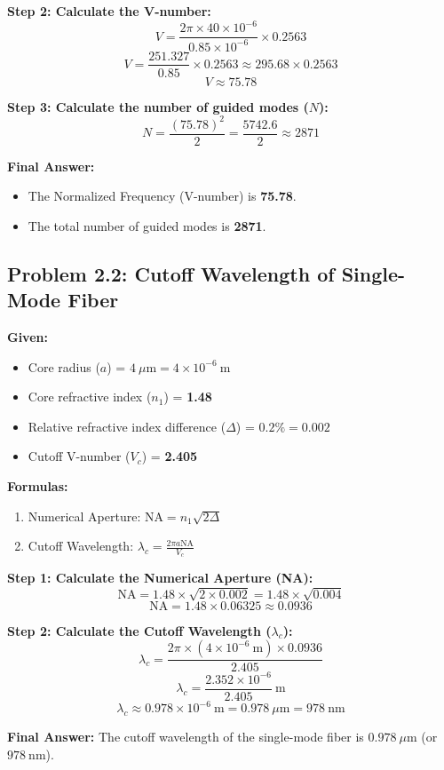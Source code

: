 \textbf{Step 2: Calculate the V-number:}
\[ V = \frac{2\pi \times 40 \times 10^{-6}}{0.85 \times 10^{-6}} \times 0.2563 \]
\[ V = \frac{251.327}{0.85} \times 0.2563 \approx 295.68 \times 0.2563 \]
\[ V \approx 75.78 \]

\textbf{Step 3: Calculate the number of guided modes ($N$):}
\[ N = \frac{(75.78)^2}{2} = \frac{5742.6}{2} \approx 2871 \]

\textbf{Final Answer:}
\begin{itemize}
  \item   The Normalized Frequency (V-number) is \textbf{75.78}.
  \item   The total number of guided modes is \textbf{2871}.
\end{itemize}


\subsection{Problem 2.2: Cutoff Wavelength of Single-Mode Fiber}
\textbf{Given:}
\begin{itemize}
  \item   Core radius ($a$) = $4\ \mu\text{m} = 4 \times 10^{-6}\ \text{m}$
  \item   Core refractive index ($n_1$) = \textbf{1.48}
  \item   Relative refractive index difference ($\Delta$) = $0.2\% = 0.002$
  \item   Cutoff V-number ($V_c$) = \textbf{2.405}
\end{itemize}

\textbf{Formulas:}
\begin{enumerate}
  \item Numerical Aperture: $\text{NA} = n_1\sqrt{2\Delta}$
  \item Cutoff Wavelength: $\lambda_c = \frac{2\pi a \text{NA}}{V_c}$
\end{enumerate}

\textbf{Step 1: Calculate the Numerical Aperture (NA):}
\[ \text{NA} = 1.48 \times \sqrt{2 \times 0.002} = 1.48 \times \sqrt{0.004} \]
\[ \text{NA} = 1.48 \times 0.06325 \approx 0.0936 \]

\textbf{Step 2: Calculate the Cutoff Wavelength ($\lambda_c$):}
\[ \lambda_c = \frac{2\pi \times (4 \times 10^{-6}\ \text{m}) \times 0.0936}{2.405} \]
\[ \lambda_c = \frac{2.352 \times 10^{-6}}{2.405}\ \text{m} \]
\[ \lambda_c \approx 0.978 \times 10^{-6}\ \text{m} = 0.978\ \mu\text{m} = 978\ \text{nm} \]

\textbf{Final Answer:}
The cutoff wavelength of the single-mode fiber is \textbf{$0.978\ \mu\text{m}$} (or \textbf{$978\ \text{nm}$}).
